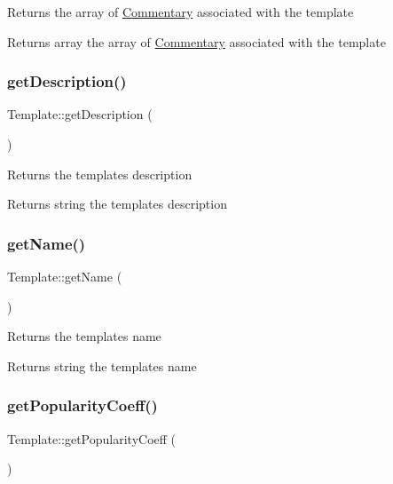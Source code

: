 Returns the array of \hyperlink{classCommentary}{Commentary} associated with the template \begin{DoxyReturn}{Returns}
array the array of \hyperlink{classCommentary}{Commentary} associated with the template 
\end{DoxyReturn}
\mbox{\label{classTemplate_ad331444db21a9de12b1b722f51ea83c2}} 
\subsubsection{\texorpdfstring{get\+Description()}{getDescription()}}
{\footnotesize\ttfamily Template\+::get\+Description (\begin{DoxyParamCaption}{ }\end{DoxyParamCaption})}

Returns the template\textquotesingle{}s description \begin{DoxyReturn}{Returns}
string the template\textquotesingle{}s description 
\end{DoxyReturn}
\mbox{\label{classTemplate_abdbf91a0f8ccf03b212f8e31fa3fdeb5}} 
\subsubsection{\texorpdfstring{get\+Name()}{getName()}}
{\footnotesize\ttfamily Template\+::get\+Name (\begin{DoxyParamCaption}{ }\end{DoxyParamCaption})}

Returns the template\textquotesingle{}s name \begin{DoxyReturn}{Returns}
string the template\textquotesingle{}s name 
\end{DoxyReturn}
\mbox{\label{classTemplate_a68f43c52e0ef9cf943eb765793cdbc5d}} 
\subsubsection{\texorpdfstring{get\+Popularity\+Coeff()}{getPopularityCoeff()}}
{\footnotesize\ttfamily Template\+::get\+Popularity\+Coeff (\begin{DoxyParamCaption}{ }\end{DoxyParamCaption})}

